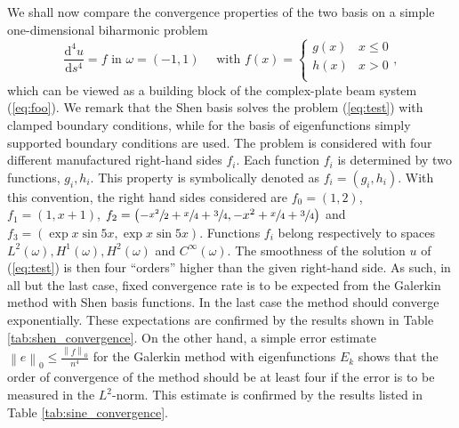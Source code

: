 \documentclass{marine_2015}
\newcommand{\inner}[2]{\ensuremath{\left(#1, #2\right)}}
\newcommand{\norm}[1]{\ensuremath{\left\|#1\right\|}}
\newcommand{\deriv}[2]{\ensuremath{\frac{\mathrm{d}#1}{\mathrm{d}#2}}}
\begin{document}
We shall now compare the convergence properties of the two basis on a simple 
one-dimensional biharmonic problem
\begin{equation}
  \label{eq:test}
  \deriv{^4u}{s^4} = f\text{ in }\omega=\left(-1, 1 \right)\quad\text{ with }f(x)=\begin{cases}
      g(x) & x \leq 0 \\
      h(x) & x > 0 \\
    \end{cases},
  \end{equation}
which can be viewed as a building block of the complex-plate beam system (\ref{eq:foo}).
We remark that the Shen basis solves the problem (\ref{eq:test}) with clamped
boundary conditions, while for the basis of eigenfunctions simply supported
boundary conditions are used. The problem is considered with four different
manufactured right-hand sides $f_i$. Each function $f_i$ is determined by two 
functions, $g_i, h_i$. This property is symbolically denoted as $f_i=\left(g_i, h_i\right)$. 
With this convention, the right hand sides considered are $f_0=\inner{1}{2}$, 
$f_1=\inner{1}{x+1}$,
$f_2=\inner{-\sfrac{x^2}{2} + \sfrac{x}{4} + \sfrac{3}{4}}{-x^2 +
\sfrac{x}{4} + \sfrac{3}{4}}$ and
$f_3=\inner{\exp{x}\sin{5x}}{\exp{x}\sin{5x}}$. Functions $f_i$ belong
respectively to spaces $L^2\left(\omega\right), H^1\left(\omega\right), 
H^2\left(\omega\right)$ and $C^{\infty}\left(\omega\right)$. The smoothness of the
solution $u$ of (\ref{eq:test}) is then four ``orders'' higher than the given
right-hand side. As such, in all but the last case, fixed convergence rate is to 
be expected from the Galerkin method with Shen basis functions. In the last case
the method should converge exponentially. These expectations are confirmed by
the results shown in Table \ref{tab:shen_convergence}. On the other hand, a simple 
error estimate $\norm{e}_0\leq\tfrac{\norm{f}_0}{n^4}$ for the Galerkin method 
with eigenfunctions $E_k$ shows that the order of convergence of the method
should be at least four if the error is to be measured in the $L^2$-norm. This 
estimate is confirmed by the results listed in Table \ref{tab:sine_convergence}.
\end{document}
